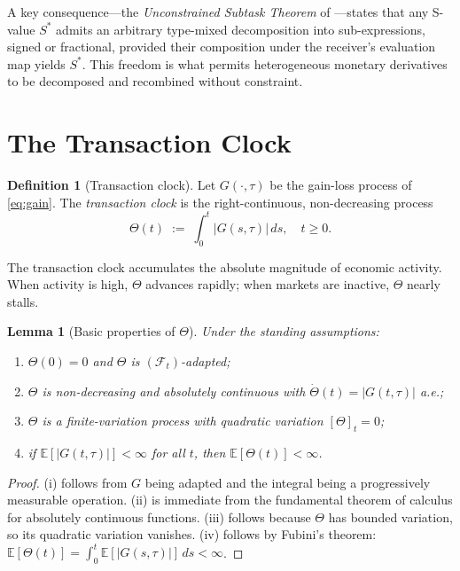 \documentclass[twocolumn,11pt,a4paper]{article}
\theoremstyle{thmstyle}
\newtheorem{lemma}[theorem]{Lemma}
\theoremstyle{definition}
\newtheorem{definition}[theorem]{Definition}
\theoremstyle{remark}
\newcommand{\Gain}{G}                        %
\newcommand{\Clock}{\Theta}                  %
\newcommand{\Sval}{S}                        %
\newcommand{\Expect}{\mathbb{E}}
\newcommand{\Filtr}{\mathcal{F}}
\begin{document}
A key consequence---the \emph{Unconstrained Subtask
Theorem} of \citet{Sachikonye2024S}---states that any
S-value $\Sval^{*}$ admits an arbitrary type-mixed
decomposition into sub-expressions, signed or fractional,
provided their composition under the receiver's evaluation
map yields $\Sval^{*}$.  This freedom is what permits
heterogeneous monetary derivatives to be decomposed and
recombined without constraint.


\section{The Transaction Clock}
\label{sec:clock}

\begin{definition}[Transaction clock]\label{def:clock}
Let $\Gain(\cdot,\tau)$ be the gain-loss process of
\eqref{eq:gain}.  The \emph{transaction clock} is the
right-continuous, non-decreasing process
\begin{equation}\label{eq:clock}
  \Clock(t) \;:=\; \int_{0}^{t} |\Gain(s,\tau)|\,ds,
  \quad t\geq 0.
\end{equation}
\end{definition}

The transaction clock accumulates the absolute magnitude
of economic activity.  When activity is high, $\Clock$
advances rapidly; when markets are inactive, $\Clock$
nearly stalls.

\begin{lemma}[Basic properties of $\Clock$]\label{lem:clock-props}
Under the standing assumptions:
\begin{enumerate}[nosep,label=(\roman*)]
\item $\Clock(0)=0$ and $\Clock$ is $(\Filtr_{t})$-adapted;
\item $\Clock$ is non-decreasing and absolutely continuous
      with $\dot\Clock(t)=|\Gain(t,\tau)|$ a.e.;
\item $\Clock$ is a finite-variation process with quadratic
      variation $[\Clock]_{t}=0$;
\item if $\Expect[|\Gain(t,\tau)|]<\infty$ for all $t$,
      then $\Expect[\Clock(t)]<\infty$.
\end{enumerate}
\end{lemma}

\begin{proof}
(i) follows from $\Gain$ being adapted and the integral
being a progressively measurable operation.  (ii) is
immediate from the fundamental theorem of calculus for
absolutely continuous functions.  (iii) follows because
$\Clock$ has bounded variation, so its quadratic variation
vanishes.  (iv) follows by Fubini's theorem:
$\Expect[\Clock(t)]=\int_{0}^{t}\Expect[|\Gain(s,\tau)|]\,ds<\infty$.
\end{proof}
\end{document}

